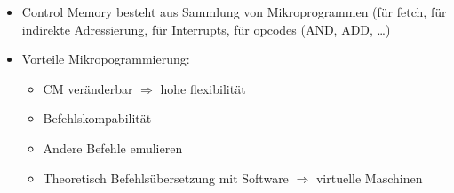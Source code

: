 \begin{itemize}
\begin{itemize}
\begin{itemize}
					\end{itemize}
			\end{itemize}
		\item
			Control Memory besteht aus Sammlung von Mikroprogrammen (für fetch, für indirekte Adressierung, für Interrupts, für opcodes (AND, ADD, \dots)
		\item
			Vorteile Mikropogrammierung: 
			\begin{itemize}
				\item
					CM veränderbar $\Rightarrow$ hohe flexibilität
				\item
					Befehlskompabilität
				\item
					Andere Befehle emulieren
				\item
					Theoretisch Befehlsübersetzung mit Software $\Rightarrow$ virtuelle Maschinen
			\end{itemize}
\end{itemize}

